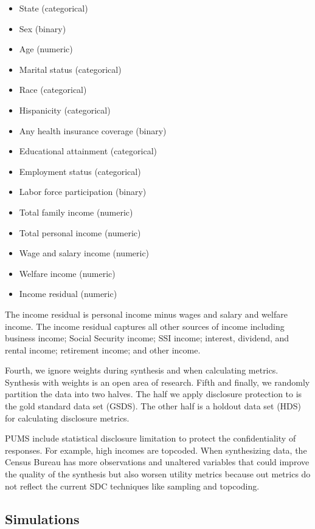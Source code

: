 \documentclass[
]{urban-formatting}
\providecommand{\tightlist}{%
  \setlength{\itemsep}{0pt}\setlength{\parskip}{0pt}}\usepackage{longtable,booktabs,array}
\begin{document}
\begin{itemize}
\tightlist
\item
  State (categorical)
\item
  Sex (binary)
\item
  Age (numeric)
\item
  Marital status (categorical)
\item
  Race (categorical)
\item
  Hispanicity (categorical)
\item
  Any health insurance coverage (binary)
\item
  Educational attainment (categorical)
\item
  Employment status (categorical)
\item
  Labor force participation (binary)
\item
  Total family income (numeric)
\item
  Total personal income (numeric)
\item
  Wage and salary income (numeric)
\item
  Welfare income (numeric)
\item
  Income residual (numeric)
\end{itemize}

The income residual is personal income minus wages and salary and
welfare income. The income residual captures all other sources of income
including business income; Social Security income; SSI income; interest,
dividend, and rental income; retirement income; and other income.

Fourth, we ignore weights during synthesis and when calculating metrics.
Synthesis with weights is an open area of research. Fifth and finally,
we randomly partition the data into two halves. The half we apply
disclosure protection to is the gold standard data set (GSDS). The other
half is a holdout data set (HDS) for calculating disclosure metrics.

PUMS include statistical disclosure limitation to protect the
confidentiality of responses. For example, high incomes are topcoded.
When synthesizing data, the Census Bureau has more observations and
unaltered variables that could improve the quality of the synthesis but
also worsen utility metrics because out metrics do not reflect the
current SDC techniques like sampling and topcoding.

\subsection{Simulations}
\end{document}
